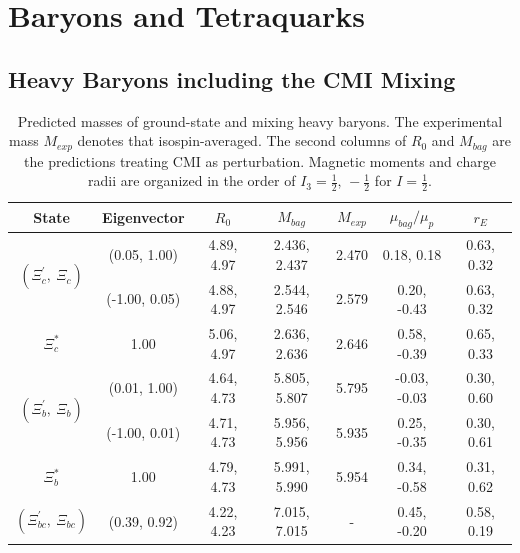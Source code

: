 \documentclass[prt,twocolumn,floatfix,nofootinbib]{revtex4}
\begin{document}
\section{Baryons and Tetraquarks}\label{Hadrons}
\subsection{Heavy Baryons including the CMI Mixing}
\renewcommand{\tabcolsep}{0.42cm}
\renewcommand{\arraystretch}{1.3}
\begin{table}[!htbp]
    \caption{Predicted masses of ground-state and mixing heavy baryons. The experimental mass $M_{exp}$ denotes that isospin-averaged.
    The second columns of $R_{0}$ and $M_{bag}$ are the predictions treating CMI as perturbation.
    Magnetic moments and charge radii are organized in the order of $I_{3}=\frac{1}{2},\,-\frac{1}{2}$ for $I=\frac{1}{2}$.}
    \label{tab:mixingbaryon}
    \begin{tabular}{ccccccc}
        \hline\hline
        {\rm State}         &{\rm Eigenvector}  &$R_{0}$        &$M_{bag}$          &$M_{exp}$  &$\mu_{bag}/\mu_{p}$    &$r_{E}$ \\ \hline
        \multirow{2}{*}{$\left(\Xi_{c}^{\prime},\ \Xi_{c}\right)$}
                            &(0.05, 1.00)       &4.89, 4.97	    &2.436, 2.437	    &2.470      &0.18, 0.18             &0.63, 0.32 \\
                            &(-1.00, 0.05)      &4.88, 4.97	    &2.544, 2.546	    &2.579      &0.20, -0.43            &0.63, 0.32 \\
        $\Xi_{c}^{\ast}$ 	&1.00               &5.06, 4.97	    &2.636, 2.636	    &2.646      &0.58, -0.39            &0.65, 0.33 \\
        \multirow{2}{*}{$\left(\Xi_{b}^{\prime},\ \Xi_{b}\right)$}
                            &(0.01, 1.00)       &4.64, 4.73	    &5.805, 5.807	    &5.795      &-0.03, -0.03           &0.30, 0.60 \\
                            &(-1.00, 0.01)      &4.71, 4.73	    &5.956, 5.956	    &5.935      &0.25, -0.35            &0.30, 0.61 \\
        $\Xi_{b}^{\ast}$ 	&1.00               &4.79, 4.73	    &5.991, 5.990	    &5.954      &0.34, -0.58            &0.31, 0.62 \\
        \multirow{2}{*}{$\left(\Xi_{bc}^{\prime},\ \Xi_{bc}\right)$}
                            &(0.39, 0.92)       &4.22, 4.23	    &7.015, 7.015	    &-          &0.45, -0.20            &0.58, 0.19 \\

\end{tabular}
\end{table}
\end{document}
